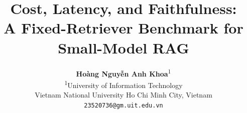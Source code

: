 \documentclass[runningheads]{llncs}
\begin{document}
\title{Cost, Latency, and Faithfulness:\\
A Fixed-Retriever Benchmark for\\
Small-Model RAG}


\author{
    \textbf{Hoàng Nguyễn Anh Khoa}\textsuperscript{1}\\
    \textsuperscript{1}University of Information Technology\\
    Vietnam National University Ho Chi Minh City, Vietnam\\
    \texttt{23520736@gm.uit.edu.vn}
}



\maketitle





















\end{document}
